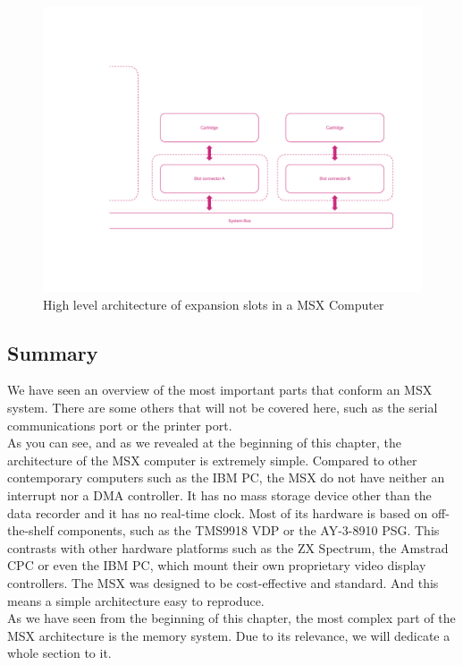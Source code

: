 \begin{figure}
	\centering
	\includegraphics[width=1\linewidth,trim={0cm 120 0 100}]{images/figures/msx-arch-slots}
	\caption{High level architecture of expansion slots in a MSX Computer}
	\label{fig:msx-arch-slots}
\end{figure}

\subsection{Summary}

We have seen an overview of the most important parts that conform an MSX system. There are some others that will not be covered here, such as the serial communications port or the printer port. \\

As you can see, and as we revealed at the beginning of this chapter, the architecture of the MSX computer is extremely simple. Compared to other contemporary computers such as the IBM PC, the MSX do not have neither an interrupt nor a DMA controller. It has no mass storage device other than the data recorder and it has no real-time clock. Most of its hardware is based on off-the-shelf components, such as the TMS9918 VDP or the AY-3-8910 PSG. This contrasts with other hardware platforms such as the ZX Spectrum, the Amstrad CPC or even the IBM PC, which mount their own proprietary video display controllers. The MSX was designed to be cost-effective and standard. And this means a simple architecture easy to reproduce. \\

As we have seen from the beginning of this chapter, the most complex part of the MSX architecture is the memory system. Due to its relevance, we will dedicate a whole section to it.


